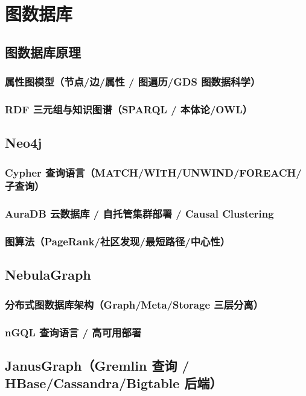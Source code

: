 \documentclass[12pt,UTF8]{ctexbook}
\begin{document}
\chapter{图数据库}
\label{chap:graph-db}

  \section{图数据库原理}
    \subsection{属性图模型（节点/边/属性 / 图遍历/GDS 图数据科学）}
    \subsection{RDF 三元组与知识图谱（SPARQL / 本体论/OWL）}

  \section{Neo4j}
    \subsection{Cypher 查询语言（MATCH/WITH/UNWIND/FOREACH/子查询）}
    \subsection{AuraDB 云数据库 / 自托管集群部署 / Causal Clustering}
    \subsection{图算法（PageRank/社区发现/最短路径/中心性）}

  \section{NebulaGraph}
    \subsection{分布式图数据库架构（Graph/Meta/Storage 三层分离）}
    \subsection{nGQL 查询语言 / 高可用部署}

  \section{JanusGraph（Gremlin 查询 / HBase/Cassandra/Bigtable 后端）}
\end{document}
